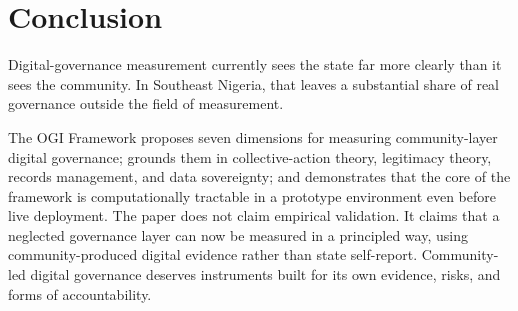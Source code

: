\documentclass[sigconf,anonymous]{acmart}
\begin{document}
\section{Conclusion}

Digital-governance measurement currently sees the state far more clearly than it sees the community. In Southeast Nigeria, that leaves a substantial share of real governance outside the field of measurement.

The OGI Framework proposes seven dimensions for measuring community-layer digital governance; grounds them in collective-action theory, legitimacy theory, records management, and data sovereignty; and demonstrates that the core of the framework is computationally tractable in a prototype environment even before live deployment. The paper does not claim empirical validation. It claims that a neglected governance layer can now be measured in a principled way, using community-produced digital evidence rather than state self-report. Community-led digital governance deserves instruments built for its own evidence, risks, and forms of accountability.
\end{document}
